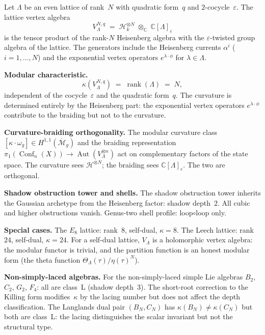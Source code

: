 \documentclass[11pt]{report}
\theoremstyle{definition}
\theoremstyle{remark}
\numberwithin{equation}{section}
\begin{document}
Let $\Lambda$ be an even lattice of rank~$N$ with quadratic
form~$q$ and $2$-cocycle~$\varepsilon$. The lattice vertex algebra
\[
V_\Lambda^{N,q}
\;=\;
\mathcal H_k^{\otimes N}
\;\otimes_{\mathbb C}\;
\mathbb C[\Lambda]_\varepsilon
\]
is the tensor product of the rank-$N$ Heisenberg algebra with the
$\varepsilon$-twisted group algebra of the lattice. The generators
include the Heisenberg currents $\alpha^i$ ($i=1,\dots,N$) and the
exponential vertex operators $e^{\lambda\cdot\phi}$ for
$\lambda\in\Lambda$.

\medskip
\noindent\textbf{Modular characteristic.}
\[
\kappa(V_\Lambda^{N,q})
\;=\;
\operatorname{rank}(\Lambda)
\;=\;
N,
\]
independent of the cocycle~$\varepsilon$ and the quadratic form~$q$.
The curvature is determined entirely by the Heisenberg part:
the exponential vertex operators $e^{\lambda\cdot\phi}$ contribute to
the braiding but not to the curvature.

\medskip
\noindent\textbf{Curvature-braiding orthogonality.}
The modular curvature class
$[\kappa\cdot\omega_g]\in H^{1,1}(\overline{\mathcal M}_g)$ and the
braiding representation
$\pi_1(\operatorname{Conf}_n(X))\to
\operatorname{Aut}(V_\Lambda^{\otimes n})$
act on complementary factors of the state space. The curvature sees
$\mathcal H^{\otimes N}$; the braiding sees
$\mathbb C[\Lambda]_\varepsilon$. The two are orthogonal.

\medskip
\noindent\textbf{Shadow obstruction tower and shells.}
The shadow obstruction tower inherits the Gaussian archetype from the Heisenberg
factor: shadow depth~$2$. All cubic and higher obstructions vanish.
Genus-two shell profile: loop$\circ$loop only.

\medskip
\noindent\textbf{Special cases.}
The $E_8$ lattice: rank~$8$, self-dual, $\kappa=8$. The Leech
lattice: rank~$24$, self-dual, $\kappa=24$. For a self-dual lattice,
$V_\Lambda$ is a holomorphic vertex algebra: the modular functor is
trivial, and the partition function is an honest modular form
(the theta function $\Theta_\Lambda(\tau)/\eta(\tau)^N$).

\medskip
\noindent\textbf{Non-simply-laced algebras.}\enspace
For the non-simply-laced simple Lie algebras $B_2$, $C_2$, $G_2$,
$F_4$: all are class~L (shadow depth~$3$). The short-root
correction to the Killing form modifies~$\kappa$ by the
lacing number but does not affect the depth classification.
The Langlands dual pair $(B_N, C_N)$ has $\kappa(B_N) \neq
\kappa(C_N)$ but both are class~L: the lacing distinguishes the
scalar invariant but not the structural type.
\end{document}
